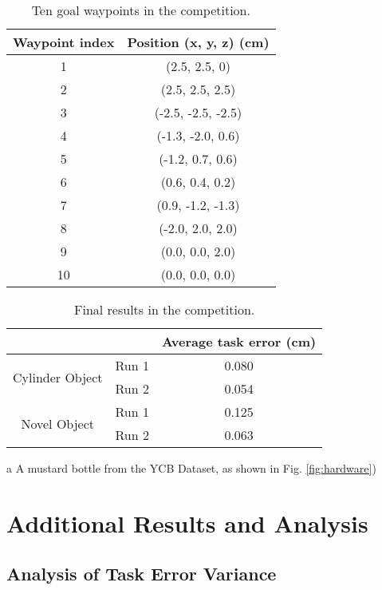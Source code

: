 {\begin{table}
\centering
\caption{Ten goal waypoints in the competition.}
\label{tab:goal_waypoints_rgmc}
\begin{tabular}{cc} 
\toprule
Waypoint index & Position (x, y, z) (cm) \\ 
\hline
1 & (2.5, 2.5, 0) \\
2 & (2.5, 2.5, 2.5) \\
3 & (-2.5, -2.5, -2.5) \\
4 & (-1.3, -2.0, 0.6) \\
5 & (-1.2, 0.7, 0.6) \\
6 & (0.6, 0.4, 0.2) \\
7 & (0.9, -1.2, -1.3) \\
8 & (-2.0, 2.0, 2.0) \\
9 & (0.0, 0.0, 2.0) \\
10 & (0.0, 0.0, 0.0) \\
\bottomrule
\end{tabular}
\end{table}

\begin{table}[!h]
\centering
\caption{Final results in the competition.}
\label{tab:results_rgmc}
\begin{threeparttable}[b]
\begin{tabular}{cc|c} 
\toprule
 &  & Average task error (cm) \\ 
\hline
\multirow{2}{*}{Cylinder Object} & Run 1 & 0.080 \\
 & Run 2 & 0.054 \\ 
\hline
\multirow{2}{*}{Novel Object\tnote{a}} & Run 1 & 0.125 \\
 & Run 2 & 0.063 \\
\bottomrule
\end{tabular}
\begin{tablenotes}
     \item[a] A mustard bottle from the YCB Dataset, as shown in Fig. \ref{fig:hardware})
\end{tablenotes}
\end{threeparttable}
\end{table}


\section{Additional Results and Analysis}

\subsection{Analysis of Task Error Variance}

}
